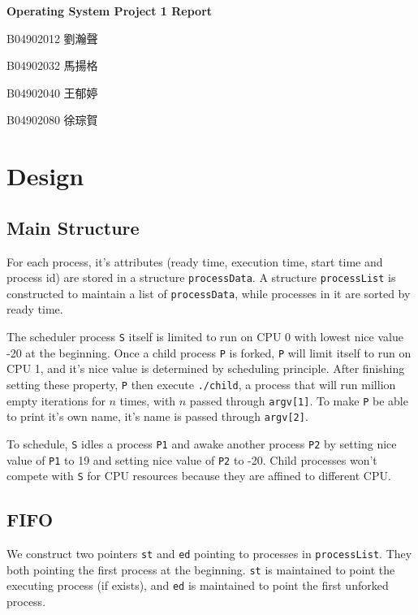 \documentclass{article}
\begin{document}
\fontsize{12pt}{20pt}\selectfont
\begin{center}
	\bfseries\huge{Operating System Project 1 Report}\\
\end{center}
{
    \hfill B04902012 劉瀚聲

    \hfill B04902032 馬揚格

    \hfill B04902040 王郁婷

    \hfill B04902080 徐琮賀\\
}
\section{Design}
    \subsection{Main Structure}

        For each process, it's attributes (ready time, execution time, start time and process id) are stored in a structure {\tt processData}.
        A structure {\tt processList} is constructed to maintain a list of {\tt processData}, while processes in it are sorted by ready time.

        The scheduler process {\tt S} itself is limited to run on CPU 0 with lowest nice value -20 at the beginning. Once a child process {\tt P} is forked, {\tt P} will limit itself to run on CPU 1, and it's nice value is determined by scheduling principle. After finishing setting these property, {\tt P} then execute {\tt ./child}, a process that will run million empty iterations for \(n\) times, with \(n\) passed through {\tt argv[1]}. To make {\tt P} be able to print it's own name, it's name is passed through {\tt argv[2]}.


        To schedule, {\tt S} idles a process {\tt P1} and awake another process {\tt P2} by setting nice value of {\tt P1}  to 19 and setting nice value of {\tt P2} to -20. Child processes won't compete with {\tt S} for CPU resources because they are affined to different CPU.
    
    \subsection{FIFO}
        We construct two pointers {\tt st} and {\tt ed} pointing to processes in {\tt processList}. They both pointing the first process at the beginning. {\tt st} is maintained to point the executing process (if exists), and {\tt ed} is maintained to point the first unforked process.
        
\end{document}
